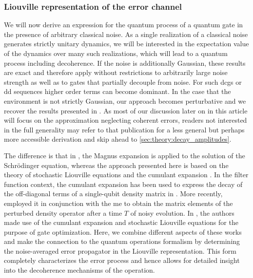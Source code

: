 \subsubsection{Liouville representation of the error channel}\label{sec:theory:transfer_matrix:derivation}
We will now derive an expression for the quantum process of a quantum gate in the presence of arbitrary classical noise. As a single realization of a classical noise generates strictly unitary dynamics, we will be interested in the expectation value of the dynamics over many such realizations, which will lead to a quantum process including decoherence. If the noise is additionally Gaussian, these results are exact and therefore apply without restrictions to arbitrarily large noise strength as well as to gates that partially decouple from noise. For such \glspl{dcg} or \gls{dd} sequences \cite{Khodjasteh2009,Cywinski2008} higher order terms can become dominant. In the case that the environment is not strictly Gaussian, our approach becomes perturbative and we recover the results presented in . As most of our discussion later on in this article will focus on the approximation neglecting coherent errors, readers not interested in the full generality may refer to that publication for a less general but perhaps more accessible derivation and skip ahead to \cref{sec:theory:decay_amplitudes}.

The difference is that in , the Magnus expansion is applied to the solution of the Schr\"odinger equation, whereas the approach presented here is based on the theory of stochastic Liouville equations and the cumulant expansion \cite{Kubo1962,Kubo1963}. In the filter function context, the cumulant expansion has been used to express the decay of the off-diagonal terms of a single-qubit density matrix in . More recently, \citeauthor{Paz-Silva2014} employed it in conjunction with the \gls{me} to obtain the matrix elements of the perturbed density operator after a time $T$ of noisy evolution. In , the authors made use of the cumulant expansion and stochastic Liouville equations for the purpose of gate optimization. Here, we combine different aspects of these works and make the connection to the quantum operations formalism by determining the noise-averaged error propagator in the Liouville representation. This form completely characterizes the error process and hence allows for detailed insight into the decoherence mechanisms of the operation.

